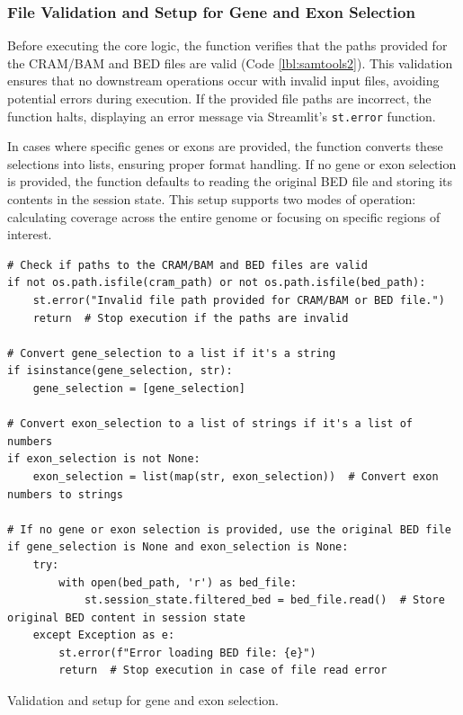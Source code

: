 \subsubsection{\textbf{File Validation and Setup for Gene and Exon Selection}}

Before executing the core logic, the function verifies that the paths provided for the CRAM/BAM and BED files are valid (Code \ref{lbl:samtools2}). This validation ensures that no downstream operations occur with invalid input files, avoiding potential errors during execution. If the provided file paths are incorrect, the function halts, displaying an error message via Streamlit's \texttt{st.error} function.

In cases where specific genes or exons are provided, the function converts these selections into lists, ensuring proper format handling. If no gene or exon selection is provided, the function defaults to reading the original BED file and storing its contents in the session state. This setup supports two modes of operation: calculating coverage across the entire genome or focusing on specific regions of interest.

\begin{longlisting}
\begin{verbatim}
# Check if paths to the CRAM/BAM and BED files are valid
if not os.path.isfile(cram_path) or not os.path.isfile(bed_path):
    st.error("Invalid file path provided for CRAM/BAM or BED file.")
    return  # Stop execution if the paths are invalid

# Convert gene_selection to a list if it's a string
if isinstance(gene_selection, str):
    gene_selection = [gene_selection]

# Convert exon_selection to a list of strings if it's a list of numbers
if exon_selection is not None:
    exon_selection = list(map(str, exon_selection))  # Convert exon numbers to strings

# If no gene or exon selection is provided, use the original BED file
if gene_selection is None and exon_selection is None:
    try:
        with open(bed_path, 'r') as bed_file:
            st.session_state.filtered_bed = bed_file.read()  # Store original BED content in session state
    except Exception as e:
        st.error(f"Error loading BED file: {e}")
        return  # Stop execution in case of file read error
\end{verbatim}
\caption{Validation and setup for gene and exon selection.}
\label{lbl:samtools2}
\end{longlisting}


